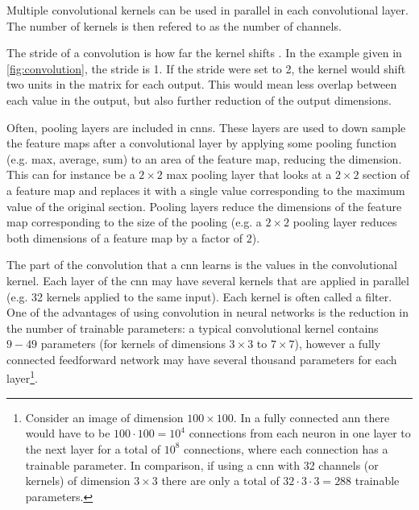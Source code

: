 Multiple convolutional kernels can be used in parallel in each convolutional layer. The number of kernels is then refered to as the number of channels. 

The stride of a convolution is how far the kernel shifts \cite{oshea2015introduction}. In the example given in \cref{fig:convolution}, the stride is 1. If the stride were set to 2, the kernel would shift two units in the matrix for each output. This would mean less overlap between each value in the output, but also further reduction of the output dimensions. 

Often, pooling layers are included in \acrshort{cnn}s. These layers are used to down sample the feature maps after a convolutional layer by applying some pooling function (e.g. max, average, sum) to an area of the feature map, reducing the dimension. This can for instance be a $2\times2$ max pooling layer that looks at a $2\times2$ section of a feature map and replaces it with a single value corresponding to the maximum value of the original section. Pooling layers reduce the dimensions of the feature map corresponding to the size of the pooling (e.g. a $2\times2$ pooling layer reduces both dimensions of a feature map by a factor of $2$). 

The part of the convolution that a \acrshort{cnn} learns is the values in the convolutional kernel. Each layer of the \acrshort{cnn} may have several kernels that are applied in parallel (e.g. 32 kernels applied to the same input). Each kernel is often called a filter. One of the advantages of using convolution in neural networks is the reduction in the number of trainable parameters: a typical convolutional kernel contains $9-49$ parameters (for kernels of dimensions $3\times3$ to $7\times7$), however a fully connected feedforward network may have several thousand parameters for each layer\footnote{Consider an image of dimension $100\times100$. In a fully connected \acrshort{ann} there would have to be $100 \cdot 100 = 10^4$ connections from each neuron in one layer to the next layer for a total of $10^{8}$ connections, where each connection has a trainable parameter. In comparison, if using a \acrshort{cnn} with 32 channels (or kernels) of dimension $3\times3$ there are only a total of $32 \cdot 3 \cdot 3 = 288$ trainable parameters. }. 

